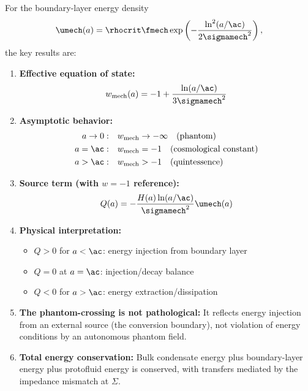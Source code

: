 \begin{proposition}
\label{prop:summary}
For the boundary-layer energy density
\begin{equation}
\umech(a) = \rhocrit \fmech \exp\left(-\frac{\ln^2(a/\ac)}{2\sigmamech^2}\right),
\end{equation}
the key results are:

\begin{enumerate}
\item \textbf{Effective equation of state:}
\begin{equation}
w_{\mathrm{mech}}(a) = -1 + \frac{\ln(a/\ac)}{3\sigmamech^2}
\end{equation}

\item \textbf{Asymptotic behavior:}
\begin{align}
a \to 0: &\quad w_{\mathrm{mech}} \to -\infty \quad \text{(phantom)} \\
a = \ac: &\quad w_{\mathrm{mech}} = -1 \quad \text{(cosmological constant)} \\
a > \ac: &\quad w_{\mathrm{mech}} > -1 \quad \text{(quintessence)}
\end{align}

\item \textbf{Source term (with $w=-1$ reference):}
\begin{equation}
Q(a) = -\frac{H(a)\ln(a/\ac)}{\sigmamech^2}\umech(a)
\end{equation}

\item \textbf{Physical interpretation:}
\begin{itemize}
\item $Q > 0$ for $a < \ac$: energy injection from boundary layer
\item $Q = 0$ at $a = \ac$: injection/decay balance
\item $Q < 0$ for $a > \ac$: energy extraction/dissipation
\end{itemize}

\item \textbf{The phantom-crossing is not pathological:} It reflects energy injection from an external source (the conversion boundary), not violation of energy conditions by an autonomous phantom field.

\item \textbf{Total energy conservation:} Bulk condensate energy plus boundary-layer energy plus protofluid energy is conserved, with transfers mediated by the impedance mismatch at $\Sigma$.
\end{enumerate}
\end{proposition}



